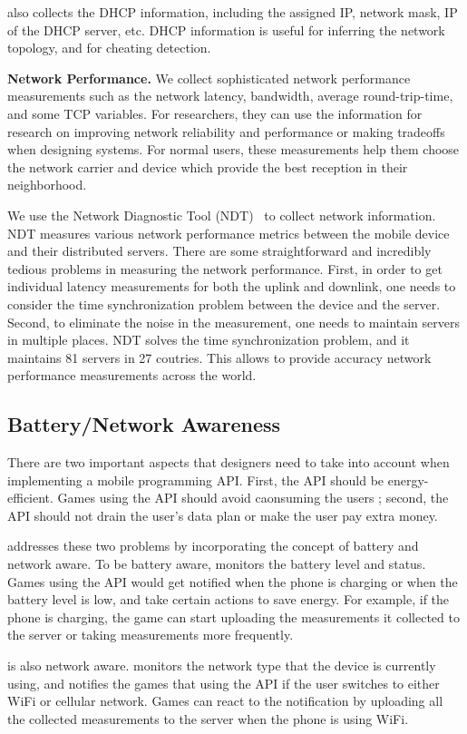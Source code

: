 \name{} also collects the DHCP information, including the assigned IP, network mask, IP of the DHCP server, etc.
DHCP information is useful for inferring the network topology, and for cheating detection.
 
 
{\bfseries Network Performance.} We collect sophisticated network performance measurements 
such as the network latency, bandwidth, average round-trip-time, and some TCP variables. 
For researchers, they can use the information for research on improving network reliability and performance or
 making tradeoffs when designing systems. 
For normal users, these measurements help them choose the network carrier and device which provide
 the best reception in their neighborhood. 

We use the Network Diagnostic Tool (NDT)~\cite{NDT} to collect network information. NDT measures various network 
performance metrics between the mobile device and their distributed servers. There are some straightforward 
and incredibly tedious problems in measuring the network performance. First, in order to get individual latency
measurements for both the uplink and downlink, one needs to consider the time 
synchronization problem between the device and the server. Second, to eliminate the noise in the measurement, 
one needs to maintain servers in multiple places. 
NDT solves the time synchronization problem, and it maintains 81 servers in 27 coutries. This allows \name{}
to provide accuracy network performance measurements across the world.

\subsection{Battery/Network Awareness}
\label{ss:awareness}
There are two important aspects that designers need to take into account when implementing a mobile 
programming API. First, the API should be energy-efficient. 
Games using the API should avoid caonsuming the users ; second, the API should
not drain the user's data plan or make the user pay extra money. 
 
\name{} addresses these two problems by incorporating the concept of battery and network aware. 
To be battery aware, \name{} monitors the battery level and status. Games using the API would get
notified when the phone is charging or when the battery level is low, and take certain actions
to save energy. For example, if the phone is charging, the game can start uploading the measurements 
it collected to the server or taking measurements more frequently. 

\name{} is also network aware. \name{} monitors the network type that the device is currently using, 
and notifies the games that using the API if the user switches to either WiFi or cellular network.
Games can react to the notification by uploading all the collected measurements to the server when
the phone is using WiFi.

